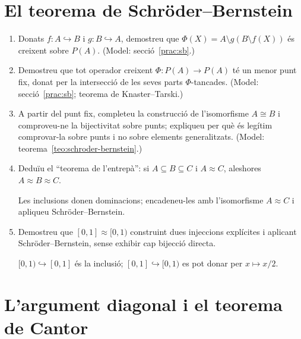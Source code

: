 \section{El teorema de Schröder--Bernstein}

\begin{enumerate}[resume]
  \item Donats \(f\colon A\hookrightarrow B\) i \(g\colon B\hookrightarrow A\), demostreu que \(\Phi(X)=A\setminus g(B\setminus f(X))\) és creixent sobre \(P(A)\). (Model: secció~\ref{prac:sb}.)

  \item Demostreu que tot operador creixent \(\Phi\colon P(A)\to P(A)\) té un menor punt fix, donat per la intersecció de les seves parts \(\Phi\)-tancades. (Model: secció~\ref{prac:sb}; teorema de Knaster--Tarski.)

  \item A partir del punt fix, completeu la construcció de l'isomorfisme \(A\cong B\) i comproveu-ne la bijectivitat sobre punts; expliqueu per què és legítim comprovar-la sobre punts i no sobre elements generalitzats. (Model: teorema~\ref{teo:schroder-bernstein}.)

  \item Deduïu el \enquote{teorema de l'entrepà}: si \(A\subseteq B\subseteq C\) i \(A\approx C\), aleshores \(A\approx B\approx C\). \begin{indicacio}Les inclusions donen dominacions; encadeneu-les amb l'isomorfisme \(A\approx C\) i apliqueu Schröder--Bernstein.\end{indicacio}

  \item Demostreu que \([0,1]\approx[0,1)\) construint dues injeccions explícites i aplicant Schröder--Bernstein, sense exhibir cap bijecció directa. \begin{indicacio}\([0,1)\hookrightarrow[0,1]\) és la inclusió; \([0,1]\hookrightarrow[0,1)\) es pot donar per \(x\mapsto x/2\).\end{indicacio}
\end{enumerate}

\section{L'argument diagonal i el teorema de Cantor}

